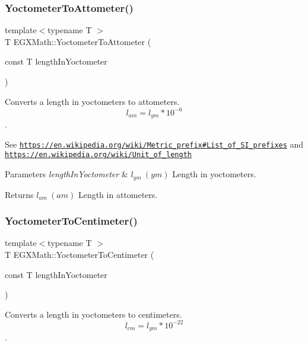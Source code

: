 \subsubsection{\texorpdfstring{Yoctometer\+To\+Attometer()}{YoctometerToAttometer()}}
{\footnotesize\ttfamily template$<$typename T $>$ \\
T E\+G\+X\+Math\+::\+Yoctometer\+To\+Attometer (\begin{DoxyParamCaption}\item[{const T}]{length\+In\+Yoctometer }\end{DoxyParamCaption})}



Converts a length in yoctometers to attometers. \[ l_{am}=l_{ym} * 10^{-6} \]. 

See \href{https://en.wikipedia.org/wiki/Metric_prefix#List_of_SI_prefixes}{\tt https\+://en.\+wikipedia.\+org/wiki/\+Metric\+\_\+prefix\#\+List\+\_\+of\+\_\+\+S\+I\+\_\+prefixes} and \href{https://en.wikipedia.org/wiki/Unit_of_length}{\tt https\+://en.\+wikipedia.\+org/wiki/\+Unit\+\_\+of\+\_\+length} 
\begin{DoxyParams}{Parameters}
{\em length\+In\+Yoctometer} & $ l_{ym}\ (ym)$ Length in yoctometers. \\
\hline
\end{DoxyParams}
\begin{DoxyReturn}{Returns}
$ l_{am}\ (am)$ Length in attometers. 
\end{DoxyReturn}
\mbox{\label{group___e_g_x_math-_conversions-_length_conversions-_yoctometer-_s_i_ga38e9c49d57f1e2af4ff3a8cdb460fe7c}} 
\subsubsection{\texorpdfstring{Yoctometer\+To\+Centimeter()}{YoctometerToCentimeter()}}
{\footnotesize\ttfamily template$<$typename T $>$ \\
T E\+G\+X\+Math\+::\+Yoctometer\+To\+Centimeter (\begin{DoxyParamCaption}\item[{const T}]{length\+In\+Yoctometer }\end{DoxyParamCaption})}



Converts a length in yoctometers to centimeters. \[ l_{cm}=l_{ym} * 10^{-22} \]. 

